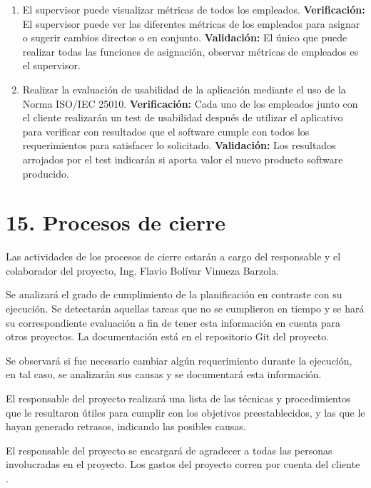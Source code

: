 \documentclass[
11pt, %
]{charter}
\begin{document}
\begin{enumerate}
\begin{enumerate}
			\item El supervisor puede visualizar métricas de todos los empleados.
			\newline
			\textbf{Verificación:}
			El supervisor puede ver las diferentes métricas de los empleados para asignar o sugerir cambios directos o en conjunto.
			\newline
		    \textbf{Validación:}
		    El único que puede realizar todas las funciones de asignación, observar métricas de empleados es el supervisor.
			\item Realizar la evaluación de usabilidad de la aplicación mediante el uso de la Norma ISO/IEC 25010.
			\newline
			\textbf{Verificación:}
			Cada uno de los empleados junto con el cliente realizarán un test de usabilidad después de utilizar el aplicativo para verificar con resultados que el software cumple con todos los requerimientos para satisfacer lo solicitado.
			\newline
		    \textbf{Validación:}
		    Los resultados arrojados por el test indicarán si aporta valor el nuevo producto software producido.
		\end{enumerate}
\end{enumerate}

\section{15. Procesos de cierre}    
\label{sec:cierre}

Las actividades de los procesos de cierre estarán a cargo del responsable \authorname y el colaborador del proyecto, Ing. Flavio Bolívar Vinueza Barzola.

Se analizará el grado de cumplimiento de la planificación en contraste con su ejecución. Se
detectarán aquellas tareas que no se cumplieron en tiempo y se hará su correspondiente
evaluación a fin de tener esta información en cuenta para otros proyectos. La documentación está en el repositorio Git del proyecto.

Se observará si fue necesario cambiar algún requerimiento durante la ejecución, en tal
caso, se analizarán sus causas y se documentará esta información.

El responsable del proyecto realizará una lista de las técnicas y procedimientos que le
resultaron útiles para cumplir con los objetivos preestablecidos, y las que le hayan generado
retrasos, indicando las posibles causas.

El responsable del proyecto se encargará de agradecer a todas las personas involucradas en el
proyecto. Los gastos del proyecto corren por cuenta del cliente \clientename.
\end{document}
